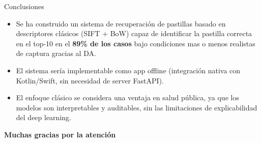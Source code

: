 \documentclass[aspectratio=169,11pt]{beamer}
\begin{document}
\begin{frame}{Conclusiones}

  \begin{itemize}
    \setlength\itemsep{0.35cm}
    \item Se ha construido un sistema de recuperación de pastillas basado
    en descriptores clásicos (SIFT + BoW) capaz de identificar la pastilla
    correcta en el top-10 en el \textbf{89\% de los casos} bajo condiciones
    mas o menos realistas de captura gracias al DA.
    \item El sistema sería implementable como app offline (integración nativa
    con Kotlin/Swift, sin necesidad de server FastAPI). 

    \item El enfoque clásico se
    considera una ventaja en salud pública, ya que los modelos son interpretables y
    auditables, sin las limitaciones de explicabilidad del deep learning.
  \end{itemize}

\end{frame}

\begin{frame}{\phantom{Cierre}}
  \centering
  \vfill

  \begin{center}
  {\Huge \textbf{Muchas gracias por la atención}}
  \end{center}

  \vfill
\end{frame}
\end{document}
